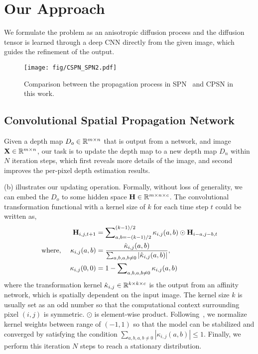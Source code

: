 \section{Our Approach}
We formulate the problem as an anisotropic diffusion process and the diffusion tensor is learned through a deep CNN directly from the given image, which guides the refinement of the output.

\begin{figure}[t]
\texttt{[image: fig/CSPN\_SPN2.pdf]}
\caption{Comparison between the propagation process in SPN~\cite{liu2017learning} and CPSN in this work.}
\label{fig:compare}
\end{figure}

\subsection{Convolutional Spatial Propagation Network}
Given a depth map $D_o \in {\mathbb R}^{m\times n}$ that is output from a network, and image ${\mathbf X} \in {\mathbb R}^{m\times n}$, our task is to update the depth map to a new depth map $D_n$ within $N$ iteration steps, which first reveals more details of the image, and second improves the per-pixel depth estimation results. 

(b) illustrates our updating operation. Formally, without loss of generality, we can embed the $D_o$ to some hidden space ${\mathbf H} \in {\mathbb R}^{m \times n \times c}$. The convolutional transformation functional with a kernel size of $k$ for each time step $t$ could be written as,
\begin{align}
    {\mathbf H}_{i, j, t + 1} &= \sum\nolimits_{a,b = -(k-1)/2}^{(k-1)/2} \kappa_{i,j}(a, b) \odot {\mathbf H}_{i-a, j-b, t} \nonumber \\
\mbox{where,~~~~}
    \kappa_{i,j}(a, b) &= \frac{\hat{\kappa}_{i,j}(a, b)}{\sum_{a,b, a, b \neq 0} |\hat{\kappa}_{i,j}(a, b)|}, \nonumber\\
    \kappa_{i,j}(0, 0) &= 1 - \sum\nolimits_{a,b, a, b \neq 0}\kappa_{i,j}(a, b)
\label{eqn:cspn}
\end{align}
where the transformation kernel $\hat{\kappa}_{i,j} \in {\mathbb R}^{k\times k \times c}$ is the output from an affinity network, which is spatially dependent on the input image. The kernel size $k$ is usually set as an odd number so that the computational context surrounding pixel $(i, j)$ is symmetric.
$\odot$ is element-wise product. Following~\cite{liu2017learning}, we normalize kernel weights between range of $(-1, 1)$ so that the model can be stabilized and converged by satisfying the condition $\sum_{a,b, a,b \neq 0} |\kappa_{i,j}(a, b)| \leq 1$. Finally, we perform this iteration $N$ steps to reach a stationary distribution.

